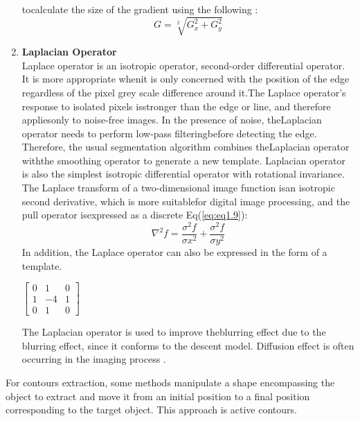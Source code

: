 \begin{enumerate}[label=(\alph*)]
                tocalculate the size of the gradient using the following :
                        \begin{equation}
                                G = \sqrt[2]{G^{2}_{x} + G^{2}_{y}}
                                \label{eq:eq1.8}
                        \end{equation}
                \item \textbf{Laplacian Operator} \\
                Laplace operator is an isotropic operator, second-order differential operator.
                It is more appropriate whenit is only concerned with the position of the edge regardless of
                the pixel grey scale difference around it.The Laplace operator's response to isolated pixels
                isstronger than the edge or line, and therefore appliesonly to noise-free images.
                In the presence of noise, theLaplacian operator needs to perform low-pass filteringbefore
                detecting the edge. Therefore, the usual segmentation algorithm combines theLaplacian operator
                withthe smoothing operator to generate a new template.
                Laplacian operator is also the simplest isotropic differential operator with rotational invariance.
                The Laplace transform of a two-dimensional image function isan isotropic second derivative,
                which is more suitablefor digital image processing, and the pull operator isexpressed as a discrete Eq(\ref{eq:eq1.9}):
                        \begin{equation}
                                \nabla^{2} f = \frac{\sigma^2 f}{\sigma x^2 } + \frac{\sigma^2 f}{\sigma y^2 }
                                \label{eq:eq1.9}
                        \end{equation}
                In addition, the Laplace operator can also be expressed in the form of a template.
               \begin{center}
                       $
                       \begin{bmatrix}
                               0 & 1 & 0 \\
                               1 & -4 & 1 \\
                               0 & 1 & 0
                       \end{bmatrix}
                       $
               \end{center}
                The Laplacian operator is used to improve theblurring effect due to the blurring effect,
                since it conforms to the descent model. Diffusion effect is often occurring in the imaging process \cite{1.18}.
        \end{enumerate}
For contours extraction, some methods manipulate a shape encompassing the object to extract and move it from an initial
position to a final position corresponding to the target object. This approach is active contours.
